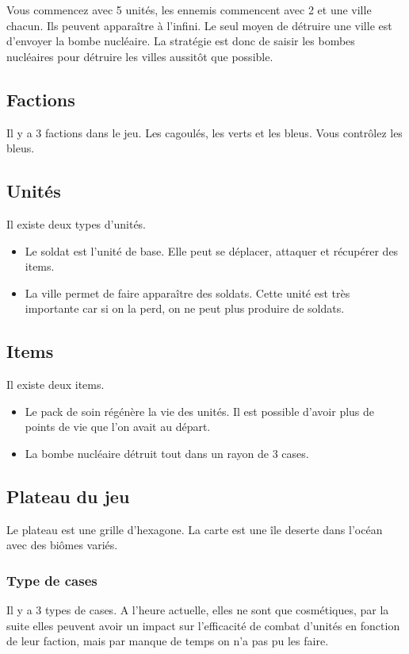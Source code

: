 \documentclass{article}
\begin{document}
Vous commencez avec 5 unités, les ennemis commencent avec 2 et une ville chacun. Ils peuvent apparaître à l'infini. 
Le seul moyen de détruire une ville est d'envoyer la bombe nucléaire. La stratégie est donc de saisir les bombes nucléaires pour
détruire les villes aussitôt que possible.


\subsection{Factions}
Il y a 3 factions dans le jeu. Les cagoulés, les verts et les bleus. Vous contrôlez les bleus.

\subsection{Unités}
Il existe deux types d'unités.

\begin{itemize}
    \item Le soldat est l'unité de base. Elle peut se déplacer, attaquer et récupérer des items.
    \item La ville permet de faire apparaître des soldats. Cette unité est très importante car si on la perd, on ne peut plus produire de soldats.
\end{itemize}

\subsection{Items}
Il existe deux items.

\begin{itemize}
    \item Le pack de soin régénère la vie des unités. Il est possible d'avoir plus de points de vie que l'on avait au départ.
    \item La bombe nucléaire détruit tout dans un rayon de 3 cases.
\end{itemize}

\subsection{Plateau du jeu}
Le plateau est une grille d'hexagone. La carte est une île deserte dans l'océan avec des biômes variés.

\subsubsection{Type de cases}
Il y a 3 types de cases. A l'heure actuelle, elles ne sont que cosmétiques, par la suite elles peuvent avoir un impact sur l'efficacité de combat d'unités en fonction de leur faction,
mais par manque de temps on n'a pas pu les faire.
\end{document}

